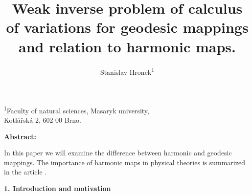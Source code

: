 \documentclass[english]{article}
\begin{document}
\title{\bf Weak inverse problem of calculus of variations for geodesic mappings and relation to harmonic maps.}

\author{Stanislav Hronek\textsuperscript{1}}

\maketitle
\thispagestyle{fancy}

\begin{center}
\textsuperscript{1}Faculty of natural sciences, Masaryk university,\\
 Kotlářská 2, 602 00 Brno.\\


\end{center}

\vspace{1cm}

{\bf Abstract:} 



 In this paper we will examine the difference between harmonic and geodesic mappings. The importance of harmonic maps in physical theories is summarized in the article \cite{mis}.

\begin{center}
{\bf 1. Introduction and motivation}
\end{center}

\end{document}
